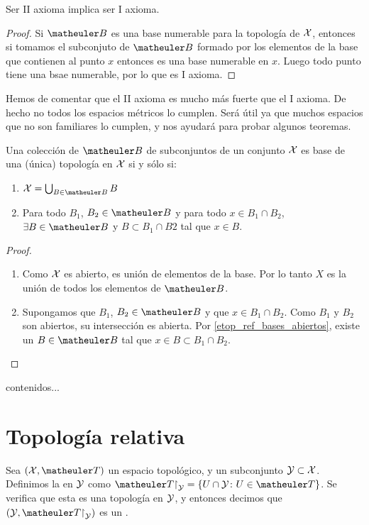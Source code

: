 \begin{obs}
	Ser II axioma implica ser I axioma.
\end{obs}
\begin{proof}
	Si $\B$ es una base numerable para la topología de $\mathcal{X}$, entonces si tomamos el subconjuto de $\B$ formado por los elementos de la base que contienen al punto $x$ entonces es una base numerable en $x$. Luego todo punto tiene una bsae numerable, por lo que es I axioma.
\end{proof}
Hemos de comentar que el II axioma es mucho más fuerte que el I axioma. De hecho no todos los espacios métricos lo cumplen. Será útil ya que muchos espacios que no son familiares lo cumplen, y nos ayudará para probar algunos teoremas.
\begin{prop}
	Una colección de $\B$ de subconjuntos de un conjunto $\mathcal{X}$ es base de una (única) topología en $\mathcal{X}$ si y sólo si:
	\begin{enumerate}
		\item $\X = \bigcup_{B \in \B}B$
		\item Para todo $B_1$, $B_2 \in \B$ y para todo $x \in B_1 \cap B_2$,  $\exists B \in \B$  y  $B \subset B_1 \cap B2$ tal que $x \in B$.
	\end{enumerate}
\begin{proof}
	\begin{enumerate}
		\item Como $\mathcal{X}$ es abierto, es unión de elementos de la base. Por lo tanto $X$ es la unión de todos los elementos de $\B$.
		\item Supongamos que $B_1$, $B_2 \in \B$ y que $x \in B_1 \cap B_2$. Como $B_1$ y $B_2$ son abiertos, su intersección es abierta. Por \ref{etop_ref_bases_abiertos}, existe un $B \in \B$ tal que $x \in B \subset B_1 \cap B_2$.
	\end{enumerate}
\end{proof}
\end{prop}
\begin{exa}
	contenidos...
\end{exa}


\section{Topología relativa}

\begin{defi}
	Sea $(\X,\T)$ un espacio topológico, y un subconjunto $\mathcal{Y}\subset\mathcal{X}$. Definimos la  en $\mathcal{Y}$ como $\T\restriction_\mc{Y} = \{U\cap\mc{Y}\colon U\in\T\}$. Se verifica que esta es una topología en $\mathcal{Y}$, y entonces decimos que $(\mc{Y},\T\restriction_\mc{Y})$ es un .
\end{defi}

